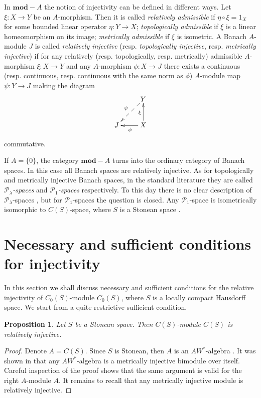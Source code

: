 \documentclass[12pt]{article}
\newtheorem{proposition}[theorem]{Proposition}
\begin{document}
In $\mathbf{mod}-A$ the notion of injectivity can be defined in different ways. Let $\xi:X\to Y$ be an $A$-morphism. Then it is called \textit{relatively admissible} if $\eta\circ \xi=1_X$ for some bounded linear operator $\eta:Y\to X$; \textit{topologically admissible} if $\xi$ is a linear homeomorphism on its image; \textit{metrically admissible} if $\xi$ is isometric.
A Banach $A$-module $J$ is called \textit{relatively injective} (resp. \textit{topologically injective}, resp. \textit{metrically injective}) if for any relatively (resp. topologically, resp. metrically) admissible $A$-morphism $\xi:X\to Y$ and any $A$-morphism $\phi:X\to J$ there exists a continuous (resp. continuous, resp. continuous with the same norm as $\phi$) $A$-module map $\psi:Y\to J$ making the diagram
$$
    \xymatrix{
    & {Y} \\
    {J} \ar@{<--}[ur]^{\psi} &{X} \ar[u]^{\xi} \ar[l]^{\phi}}
$$
commutative.

If $A=\{0\}$, the category $\mathbf{mod}-A$ turns into the ordinary category of Banach spaces. In this case all Banach spaces are relatively injective. As for topologically and metrically injective Banach spaces, in the standard literature they are called \textit{$\mathcal{P}_\lambda$-spaces} and \textit{$\mathcal{P}_1$-spaces} respectively. To this day there is no clear description of $\mathcal{P}_\lambda$-spaces \cite[page vi]{AvilSepInjBanSp}, but for $\mathcal{P}_1$-spaces the question is closed. Any $\mathcal{P}_1$-space is isometrically isomorphic to $C(S)$-space, where $S$ is a Stonean space \cite{HasumExtPropCompBanSp}.


\section{Necessary and sufficient conditions for injectivity}
\label{SecionNecessaryAndSufficientConditionsForInjectivity}

In this section we shall discuss necessary and sufficient conditions for the relative injectivity of $C_0(S)$-module $C_0(S)$, where $S$ is a locally compact Hausdorff space. We start from a quite restrictive sufficient condition.

\begin{proposition}\label{SStonImplRelInjCSModCS} Let $S$ be a Stonean space. Then $C(S)$-module $C(S)$ is relatively injective.
\end{proposition}
\begin{proof} Denote $A=C(S)$. Since $S$ is Stonean, then $A$ is an $AW^*$-algebra \cite[section 1, paragraph 7]{BerbBaerStRng}. It was shown in \cite[theorem 2]{TakHanBanThAndJordDecomOfModMap} that any $AW^*$-algebra is a metrically injective bimodule over itself. Careful inspection of the proof shows that the same argument is valid for the right $A$-module $A$. It remains to recall that any metrically injective module is relatively injective.
\end{proof}
\end{document}
